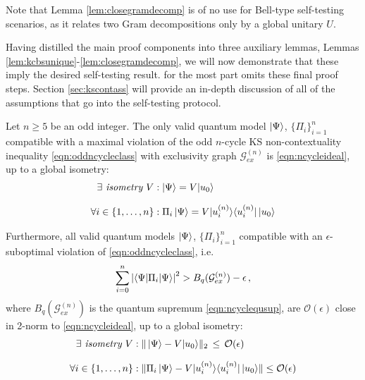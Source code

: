 Note that Lemma \ref{lem:closegramdecomp} is of no use for Bell-type self-testing scenarios, as it relates two Gram decompositions only by a global unitary $U$.

Having distilled the main proof components into three auxiliary lemmas, Lemmas \ref{lem:kcbsunique}-\ref{lem:closegramdecomp}, we will now demonstrate that these imply the desired self-testing result. \cite{Bharti2019} for the most part omits these final proof steps. Section \ref{sec:kscontass} will provide an in-depth discussion of all of the assumptions that go into the self-testing protocol.

\begin{theorem}
\label{thm:contselftesting}\hfill\break
Let $n\geq5$ be an odd integer. The only valid quantum model $\ket{\Psi}$, $\{\Pi_i\}_{i=1}^n$ compatible with a maximal violation of the odd $n$-cycle KS non-contextuality inequality \ref{eqn:oddncycleclass} with exclusivity graph $\mathcal{G}_{ex}^{(n)}$ is \ref{eqn:ncycleideal}, up to a global isometry:
\begin{align*}
    \exists \emph{ isometry } V & : \ket{\Psi} = V \vert u_0\rangle \\[0.7em]
    \forall i\in\{1,\dots,n\} & : \Pi_i \ket{\Psi} = V \vert u_i^{(n)} \rangle \langle u_i^{(n)} \vert \thinspace \vert u_0 \rangle
\end{align*}

Furthermore, all valid quantum models $\ket{\Psi}$, $\{\Pi_i\}_{i=1}^n$ compatible with an $\epsilon$-suboptimal violation of \ref{eqn:oddncycleclass}, i.e.\
\begin{equation*}
    \sum_{i=0}^n \abs{\langle \Psi \vert \Pi_i \vert \Psi \rangle}^2> B_q(\mathcal{G}_{ex}^{(n)})-\epsilon\thinspace ,
\end{equation*}where $B_q(\mathcal{G}_{ex}^{(n)})$ is the quantum supremum \ref{eqn:ncyclequsup}, are $\mathcal{O}(\epsilon)$ close in 2-norm to \ref{eqn:ncycleideal}, up to a global isometry:
\begin{align*}
    \exists \emph{ isometry } V & : \| \ket{\Psi} - V \vert u_0\rangle \|_2 \thinspace\leq\thinspace \mathcal{O}(\epsilon)\\[0.7em]
    \forall i\in\{1,\dots,n\} & : \| \Pi_i \ket{\Psi} - V \vert u_i^{(n)} \rangle \langle u_i^{(n)} \vert \thinspace \vert u_0 \rangle \| \leq \mathcal{O}(\epsilon)
\end{align*}
\end{theorem}

